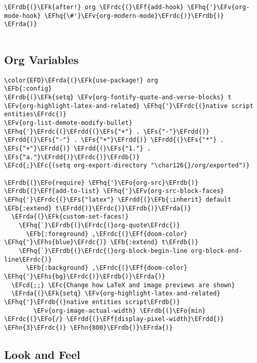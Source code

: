 \documentclass{article}
\newcommand{\EFc}[1]{\textcolor{EFc}{#1}} %
\newcommand{\EFcd}[1]{\textcolor{EFcd}{#1}} %
\newcommand{\EFs}[1]{\textcolor{EFs}{#1}} %
\newcommand{\EFk}[1]{\textcolor{EFk}{#1}} %
\newcommand{\EFb}[1]{\textcolor{EFb}{#1}} %
\newcommand{\EFf}[1]{\textcolor{EFf}{#1}} %
\newcommand{\EFv}[1]{\textcolor{EFv}{#1}} %
\newcommand{\EFo}[1]{\textcolor{EFo}{#1}} %
\newcommand{\EFhn}[1]{\textcolor{EFhn}{\textbf{#1}}} %
\newcommand{\EFhq}[1]{#1} %
\newcommand{\EFhs}[1]{\textcolor{EFhs}{#1}} %
\newcommand{\EFrda}[1]{\textcolor{EFrda}{#1}} %
\newcommand{\EFrdb}[1]{\textcolor{EFrdb}{#1}} %
\newcommand{\EFrdc}[1]{\textcolor{EFrdc}{#1}} %
\newcommand{\EFrdd}[1]{\textcolor{EFrdd}{#1}} %
\begin{document}
\begin{Code}
\begin{Verbatim}
\EFrdb{(}\EFk{after!} org \EFrdc{(}\EFf{add-hook} \EFhq{'}\EFv{org-mode-hook} \EFhq{\#'}\EFv{org-modern-mode}\EFrdc{)}\EFrdb{)}
\EFrda{)}


\end{Verbatim}
\end{Code}


\subsection{Org Variables}
\label{sec:org03da948}
\begin{Code}
\begin{Verbatim}
\color{EFD}\EFrda{(}\EFk{use-package!} org
\EFb{:config}
\EFrdb{(}\EFk{setq} \EFv{org-fontify-quote-and-verse-blocks} t
\EFv{org-highlight-latex-and-related} \EFhq{'}\EFrdc{(}native script entities\EFrdc{)}
\EFv{org-list-demote-modify-bullet} \EFhq{'}\EFrdc{(}\EFrdd{(}\EFs{"+"} . \EFs{"-"}\EFrdd{)} \EFrdd{(}\EFs{"-"} . \EFs{"+"}\EFrdd{)} \EFrdd{(}\EFs{"*"} . \EFs{"+"}\EFrdd{)} \EFrdd{(}\EFs{"1."} . \EFs{"a."}\EFrdd{)}\EFrdc{)}\EFrdb{)}
\EFcd{;}\EFc{(setq org-export-directory "\char126{}/org/exported")}

\EFrdb{(}\EFo{require} \EFhq{'}\EFo{org-src}\EFrdb{)}
\EFrdb{(}\EFf{add-to-list} \EFhq{'}\EFv{org-src-block-faces} \EFhq{'}\EFrdc{(}\EFs{"latex"} \EFrdd{(}\EFb{:inherit} default \EFb{:extend} t\EFrdd{)}\EFrdc{)}\EFrdb{)}\EFrda{)}
  \EFrda{(}\EFk{custom-set-faces!}
    \EFhq{`}\EFrdb{(}\EFrdc{(}org-quote\EFrdc{)}
      \EFb{:foreground} ,\EFrdc{(}\EFf{doom-color} \EFhq{'}\EFhs{blue}\EFrdc{)} \EFb{:extend} t\EFrdb{)}
    \EFhq{`}\EFrdb{(}\EFrdc{(}org-block-begin-line org-block-end-line\EFrdc{)}
      \EFb{:background} ,\EFrdc{(}\EFf{doom-color} \EFhq{'}\EFhs{bg}\EFrdc{)}\EFrdb{)}\EFrda{)}
  \EFcd{;;} \EFc{Change how LaTeX and image previews are shown}
  \EFrda{(}\EFk{setq} \EFv{org-highlight-latex-and-related} \EFhq{'}\EFrdb{(}native entities script\EFrdb{)}
        \EFv{org-image-actual-width} \EFrdb{(}\EFo{min} \EFrdc{(}\EFo{/} \EFrdd{(}\EFf{display-pixel-width}\EFrdd{)} \EFhn{3}\EFrdc{)} \EFhn{800}\EFrdb{)}\EFrda{)}
\end{Verbatim}
\end{Code}



\subsection{Look and Feel}
\label{sec:org45bca2b}
\end{document}
